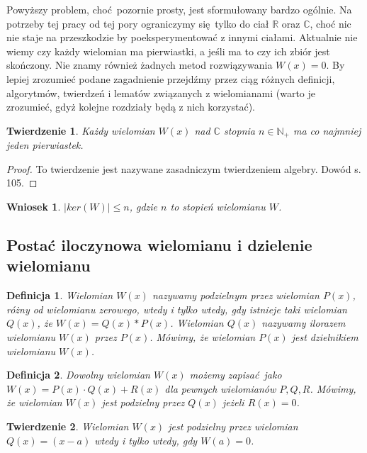 \documentclass{article}
\newtheorem{thm}{Twierdzenie}
\newtheorem{wniosek}{Wniosek}
\newtheorem{definicja}{Definicja}
\begin{document}
Powyższy problem, choć pozornie prosty, jest sformułowany bardzo ogólnie. Na potrzeby tej pracy od tej pory ograniczymy się tylko do ciał $\mathbb{R}$ oraz $\mathbb{C}$, choć nic nie staje na przeszkodzie by poeksperymentować z innymi ciałami. Aktualnie nie wiemy czy każdy wielomian ma pierwiastki, a jeśli ma to czy ich zbiór jest skończony. Nie znamy również żadnych metod rozwiązywania $W(x) = 0$. By lepiej zrozumieć podane zagadnienie przejdźmy przez ciąg różnych definicji, algorytmów, twierdzeń i lematów związanych z wielomianami (warto je zrozumieć, gdyż kolejne rozdziały będą z nich korzystać).

\begin{thm}
Każdy wielomian $W(x)$ nad $\mathbb{C}$ stopnia $n \in \mathbb{N}_+$ ma co najmniej jeden pierwiastek.
\end{thm}

\begin{proof}
To twierdzenie jest nazywane zasadniczym twierdzeniem algebry. Dowód \cite{leja} s. 105.
\end{proof}

\begin{wniosek}
$| ker(W) | \leq n$, gdzie $n$ to stopień wielomianu $W$.	
\end{wniosek}


\subsection{Postać iloczynowa wielomianu i dzielenie wielomianu}


\begin{definicja}
Wielomian $W(x)$ nazywamy podzielnym przez wielomian $P(x)$, różny od wielomianu zerowego, wtedy i tylko wtedy, gdy istnieje taki wielomian $Q(x)$, że $W(x) = Q(x) * P(x)$. Wielomian $Q(x)$ nazywamy ilorazem wielomianu $W(x)$ przez $P(x)$. Mówimy, że wielomian $P(x)$ jest dzielnikiem wielomianu $W(x)$.
\end{definicja}


\begin{definicja}
Dowolny wielomian $W(x)$ możemy zapisać jako $W(x) = P(x) \cdot Q(x) + R(x)$ dla pewnych wielomianów $P, Q, R$. Mówimy, że wielomian $W(x)$ jest podzielny przez $Q(x)$ jeżeli $R(x) = 0$. 
\end{definicja}

\begin{thm}
Wielomian $W(x)$ jest podzielny przez wielomian $Q(x) = (x-a)$ wtedy i tylko wtedy, gdy $W(a) = 0$.	
\end{thm}
\end{document}
